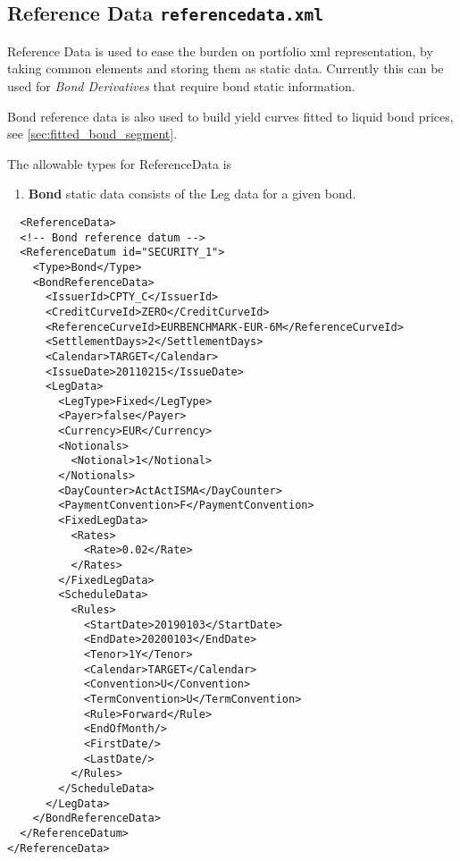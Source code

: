 \subsection{Reference Data {\tt referencedata.xml}}
\label{sec:referencedata}

Reference Data is used to ease the burden on portfolio xml representation, by taking common elements and storing them as
static data. Currently this can be used for \textit{Bond Derivatives} that require bond static information.

Bond reference data is also used to build yield curves fitted to liquid bond prices, see \ref{sec:fitted_bond_segment}.

The allowable types for ReferenceData is
\begin{enumerate}
\item \textbf{Bond} static data consists of the Leg data for a given bond.
\end{enumerate}

\begin{verbatim}
  <ReferenceData>
  <!-- Bond reference datum -->
  <ReferenceDatum id="SECURITY_1">
    <Type>Bond</Type>
    <BondReferenceData>
      <IssuerId>CPTY_C</IssuerId>
      <CreditCurveId>ZERO</CreditCurveId>
      <ReferenceCurveId>EURBENCHMARK-EUR-6M</ReferenceCurveId>
      <SettlementDays>2</SettlementDays>
      <Calendar>TARGET</Calendar>
      <IssueDate>20110215</IssueDate>
      <LegData>
        <LegType>Fixed</LegType>
        <Payer>false</Payer>
        <Currency>EUR</Currency>
        <Notionals>
          <Notional>1</Notional>
        </Notionals>
        <DayCounter>ActActISMA</DayCounter>
        <PaymentConvention>F</PaymentConvention>
        <FixedLegData>
          <Rates>
            <Rate>0.02</Rate>
          </Rates>
        </FixedLegData>
        <ScheduleData>
          <Rules>
            <StartDate>20190103</StartDate>
            <EndDate>20200103</EndDate>
            <Tenor>1Y</Tenor>
            <Calendar>TARGET</Calendar>
            <Convention>U</Convention>
            <TermConvention>U</TermConvention>
            <Rule>Forward</Rule>
            <EndOfMonth/>
            <FirstDate/>
            <LastDate/>
          </Rules>
        </ScheduleData>
      </LegData>
    </BondReferenceData>
  </ReferenceDatum>
</ReferenceData>
\end{verbatim}
